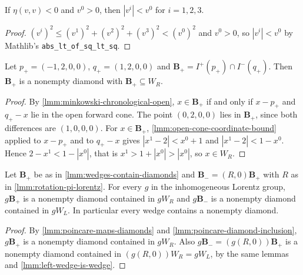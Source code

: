 \begin{lemma}
    \label{lmm:open-cone-coordinate-bound}
    \leanok
    If $\eta(v,v) < 0$ and $v^0 > 0$, then $|v^i| < v^0$ for $i = 1, 2, 3$.
\end{lemma}
\begin{proof}
    \leanok
    $(v^i)^2 \le (v^1)^2 + (v^2)^2 + (v^3)^2 < (v^0)^2$ and $v^0 > 0$, so $|v^i| < v^0$ by Mathlib's \texttt{abs\_lt\_of\_sq\_lt\_sq}.
\end{proof}

\begin{lemma}
    \label{lmm:wedges-contain-diamonds}
    \leanok
    Let $p_+ = (-1, 2, 0, 0)$, $q_+ = (1, 2, 0, 0)$ and $\mathbf{B}_+ = I^+(p_+) \cap I^-(q_+)$. Then $\mathbf{B}_+$ is a nonempty diamond with $\mathbf{B}_+ \subseteq W_R$.
\end{lemma}
\begin{proof}
    \leanok
    By \ref{lmm:minkowski-chronological-open}, $x \in \mathbf{B}_+$ if and only if $x - p_+$ and $q_+ - x$ lie in the open forward cone. The point $(0, 2, 0, 0)$ lies in $\mathbf{B}_+$, since both differences are $(1, 0, 0, 0)$. For $x \in \mathbf{B}_+$, \ref{lmm:open-cone-coordinate-bound} applied to $x - p_+$ and to $q_+ - x$ gives $|x^1 - 2| < x^0 + 1$ and $|x^1 - 2| < 1 - x^0$. Hence $2 - x^1 < 1 - |x^0|$, that is $x^1 > 1 + |x^0| > |x^0|$, so $x \in W_R$.
\end{proof}

\begin{corollary}
    \label{crllr:wedge-contains-diamond}
    \leanok
    Let $\mathbf{B}_+$ be as in \ref{lmm:wedges-contain-diamonds} and $\mathbf{B}_- = (R, 0)\mathbf{B}_+$ with $R$ as in \ref{lmm:rotation-pi-lorentz}. For every $g$ in the inhomogeneous Lorentz group, $g\mathbf{B}_+$ is a nonempty diamond contained in $gW_R$ and $g\mathbf{B}_-$ is a nonempty diamond contained in $gW_L$. In particular every wedge contains a nonempty diamond.
\end{corollary}
\begin{proof}
    \leanok
    By \ref{lmm:poincare-maps-diamonds} and \ref{lmm:poincare-diamond-inclusion}, $g\mathbf{B}_+$ is a nonempty diamond contained in $gW_R$. Also $g\mathbf{B}_- = (g(R,0))\mathbf{B}_+$ is a nonempty diamond contained in $(g(R,0))W_R = gW_L$, by the same lemmas and \ref{lmm:left-wedge-is-wedge}.
\end{proof}

